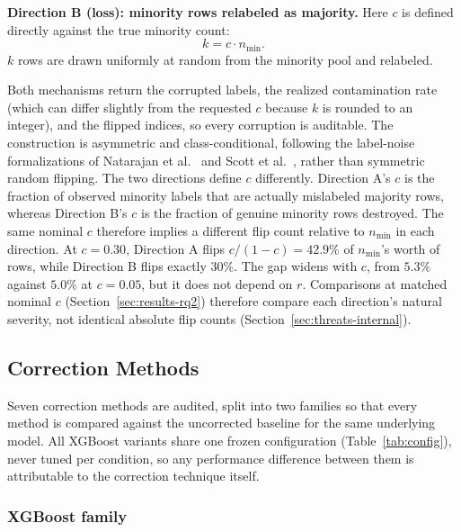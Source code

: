 \textbf{Direction B (loss): minority rows relabeled as majority.}
Here $c$ is defined directly against the true minority count:
\begin{equation}
k = c \cdot n_{\min}.
\label{eq:directionB}
\end{equation}
$k$ rows are drawn uniformly at random from the minority pool and relabeled.

Both mechanisms return the corrupted labels, the realized contamination rate (which can differ slightly from the requested $c$ because $k$ is rounded to an integer), and the flipped indices, so every corruption is auditable. The construction is asymmetric and class-conditional, following the label-noise formalizations of Natarajan et al.~\cite{natarajan2013noisylabels} and Scott et al.~\cite{scott2013asymmetricnoise}, rather than symmetric random flipping. The two directions define $c$ differently. Direction A's $c$ is the fraction of observed minority labels that are actually mislabeled majority rows, whereas Direction B's $c$ is the fraction of genuine minority rows destroyed. The same nominal $c$ therefore implies a different flip count relative to $n_{\min}$ in each direction. At $c{=}0.30$, Direction A flips $c/(1-c) = 42.9\%$ of $n_{\min}$'s worth of rows, while Direction B flips exactly $30\%$. The gap widens with $c$, from $5.3\%$ against $5.0\%$ at $c{=}0.05$, but it does not depend on $r$. Comparisons at matched nominal $c$ (Section~\ref{sec:results-rq2}) therefore compare each direction's natural severity, not identical absolute flip counts (Section~\ref{sec:threats-internal}).

\subsection{Correction Methods}
\label{sec:methods-corrections}

Seven correction methods are audited, split into two families so that every
method is compared against the uncorrected baseline for the same underlying
model. All XGBoost variants share one frozen configuration
(Table~\ref{tab:config}), never tuned per condition, so any performance
difference between them is attributable to the correction technique itself.

\subsubsection{XGBoost family}

